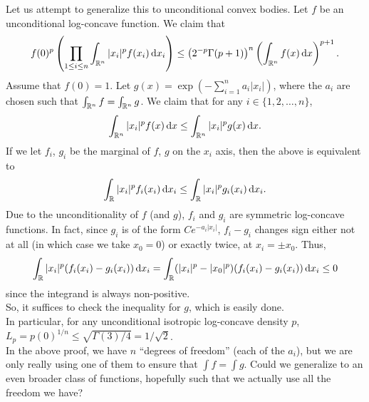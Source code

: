 \documentclass{article}
\begin{document}
	Let us attempt to generalize this to unconditional convex bodies. Let $f$ be an unconditional log-concave function. We claim that
	\begin{equation}
		f(0)^p \left( \prod_{1 \le i \le n} \int_{\Rn} |x_i|^p f(x_i) \dif x_i \right) \le \left( 2^{-p} \Gamma(p+1) \right)^n \left( \int_{\Rn} f(x) \dif x \right)^{p+1}.
	\end{equation}
	Assume that $f(0) = 1$. Let $g(x) = \exp\left(-\sum_{i=1}^n a_i |x_i|\right)$, where the $a_i$ are chosen such that $\int_{\mathbb{R}^n} f = \int_{\mathbb{R}^n} g$. We claim that for any $i \in \{1,2,\ldots,n\}$,
		\[ \int_{\Rn} |x_i|^p f(x) \dif x \leq \int_{\Rn} |x_i|^p g(x) \dif x. \]
	If we let $f_i$, $g_i$ be the marginal of $f$, $g$ on the  $x_i$ axis, then the above is equivalent to
	\[ \int_{\R} |x_i|^p f_i(x_i) \dif x_i \le \int_{\R} |x_i|^p g_i(x_i) \dif x_i. \]
	Due to the unconditionality of $f$ (and $g$), $f_i$ and $g_i$ are symmetric log-concave functions. In fact, since $g_i$ is of the form $Ce^{-a_i |x_i|}$, $f_i - g_i$ changes sign either not at all (in which case we take $x_0 = 0$) or exactly twice, at $x_i = \pm x_0$. Thus,
		\[ \int_{\R} |x_i|^p (f_i(x_i) - g_i(x_i)) \dif x_i = \int_{\R} (|x_i|^p - |x_0|^p) (f_i(x_i) - g_i(x_i)) \dif x_i \le 0 \]
	since the integrand is always non-positive.\\
	So, it suffices to check the inequality for $g$, which is easily done.\\

	In particular, for any unconditional isotropic log-concave density $p$, $L_p = p(0)^{1/n} \leq \sqrt{\Gamma(3)/4} = 1/\sqrt{2}$.\\

	In the above proof, we have $n$ ``degrees of freedom'' (each of the $a_i$), but we are only really using one of them to ensure that $\int f = \int g$. Could we generalize to an even broader class of functions, hopefully such that we actually use all the freedom we have?



\end{document}
